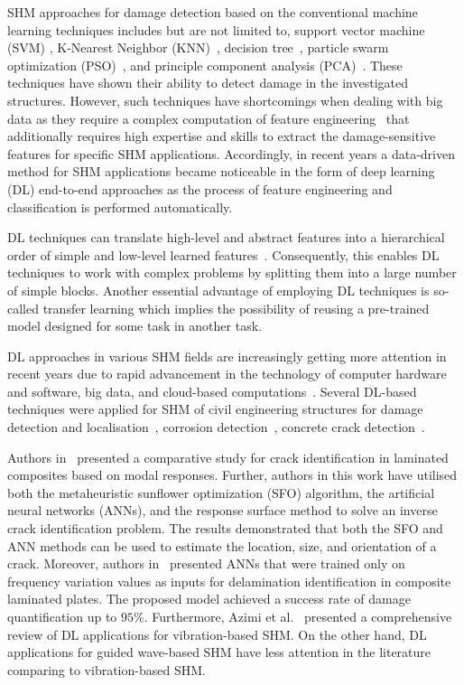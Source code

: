 SHM approaches for damage detection based on the conventional machine learning techniques includes but are not limited to, support vector machine (SVM) \cite{noori2010application, Khoa2014, Ghiasi2016}, K-Nearest Neighbor (KNN)~\cite{Vitola2017}, decision tree~\cite{Mariniello2020}, particle swarm optimization (PSO)~\cite{Khatir2018, NouriShirazi2014}, and principle component analysis (PCA)~\cite{wang2014principal, nguyen2010fault, liu2014research}.
These techniques have shown their ability to detect damage in the investigated structures.
However, such techniques have shortcomings when dealing with big data as they require a complex computation of feature engineering~\cite{Gulgec2019} that additionally requires high expertise and skills to extract the damage-sensitive features for specific SHM applications.
Accordingly, in recent years a data-driven method for SHM applications became noticeable in the form of deep learning (DL) end-to-end approaches as the process of feature engineering and classification is performed automatically.

DL techniques can translate high-level and abstract features into a hierarchical order of simple and low-level learned features~\cite{Goodfellow-et-al-2016}.
Consequently, this enables DL techniques to work with complex problems by splitting them into a large number of simple blocks. 
Another essential advantage of employing DL techniques is so-called transfer learning which implies the possibility of reusing a pre-trained model designed for some task in another task.

DL approaches in various SHM fields are increasingly getting more attention in recent years due to rapid advancement in the technology of computer hardware and software, big data, and cloud-based computations~\cite{Azimi}.
Several DL-based techniques were applied for SHM of civil engineering structures for damage detection and localisation~\cite{Cha2018, Kong2018}, corrosion detection~\cite{Atha2018}, concrete crack detection~\cite{Dung2019}.

Authors in~\cite{DeAssis2021} presented a comparative study for crack identification in laminated composites based on modal responses.
Further, authors in this work have utilised both the metaheuristic sunflower optimization (SFO) algorithm, the artificial neural networks (ANNs), and the response surface method to solve an inverse crack identification problem.
The results demonstrated that both the SFO and ANN methods can be used to estimate the location, size, and orientation of a crack.
Moreover, authors in~\cite{Oliver2021} presented ANNs that were trained only on frequency variation values as inputs for delamination identification in composite laminated plates.
The proposed model achieved a success rate of damage quantification up to \(95\%\).
Furthermore, Azimi et al.~\cite{Azimi} presented a comprehensive review of DL applications for vibration-based SHM.
On the other hand, DL applications for guided wave-based SHM have less attention in the literature comparing to vibration-based SHM.

